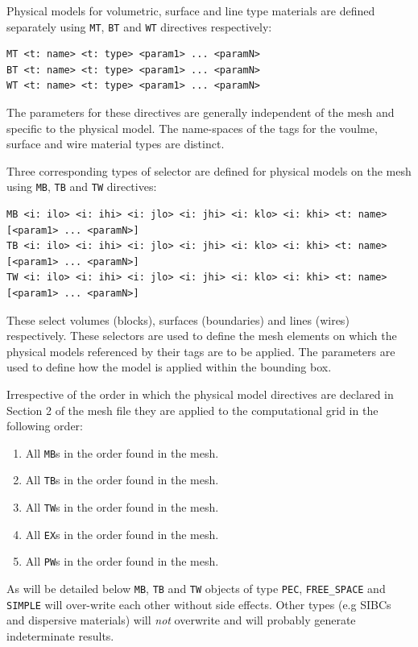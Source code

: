 \documentclass[onecolumn,a4paper]{article}
\numberwithin{equation}{section}
\begin{document}
Physical models for volumetric, surface and line type materials are defined separately 
using \texttt{MT}, \texttt{BT} and \texttt{WT} directives respectively:
\begin{verbatim}
MT <t: name> <t: type> <param1> ... <paramN>
BT <t: name> <t: type> <param1> ... <paramN>
WT <t: name> <t: type> <param1> ... <paramN>
\end{verbatim}
The parameters for these directives are generally independent of the mesh and specific 
to the physical model. The name-spaces of the tags for the voulme, surface and wire
material types are distinct. 

Three corresponding types of selector are defined for physical models on the mesh using
\texttt{MB}, \texttt{TB} and \texttt{TW} directives:
\begin{verbatim}
MB <i: ilo> <i: ihi> <i: jlo> <i: jhi> <i: klo> <i: khi> <t: name> [<param1> ... <paramN>]
TB <i: ilo> <i: ihi> <i: jlo> <i: jhi> <i: klo> <i: khi> <t: name> [<param1> ... <paramN>]
TW <i: ilo> <i: ihi> <i: jlo> <i: jhi> <i: klo> <i: khi> <t: name> [<param1> ... <paramN>]
\end{verbatim}
These select volumes (blocks), surfaces (boundaries) and lines (wires) respectively. These selectors are used to
define the mesh elements on which the physical models referenced by their tags are to be applied.
The parameters are used to define how the model is applied within the bounding box. 

Irrespective of the order in which the physical model directives are declared in Section 2 
of the mesh file they are applied to the computational grid in the following order:
\begin{enumerate}
 \item All \texttt{MB}s in the order found in the mesh.
 \item All \texttt{TB}s in the order found in the mesh.
 \item All \texttt{TW}s in the order found in the mesh.
 \item All \texttt{EX}s in the order found in the mesh.
 \item All \texttt{PW}s in the order found in the mesh.
\end{enumerate}
As will be detailed below \texttt{MB}, \texttt{TB} and \texttt{TW} objects of type \texttt{PEC}, 
\texttt{FREE\_SPACE} and \texttt{SIMPLE} will over-write each other without side effects. Other types 
(e.g SIBCs and dispersive materials) will {\it not} overwrite and will probably generate indeterminate results. 
\end{document}
